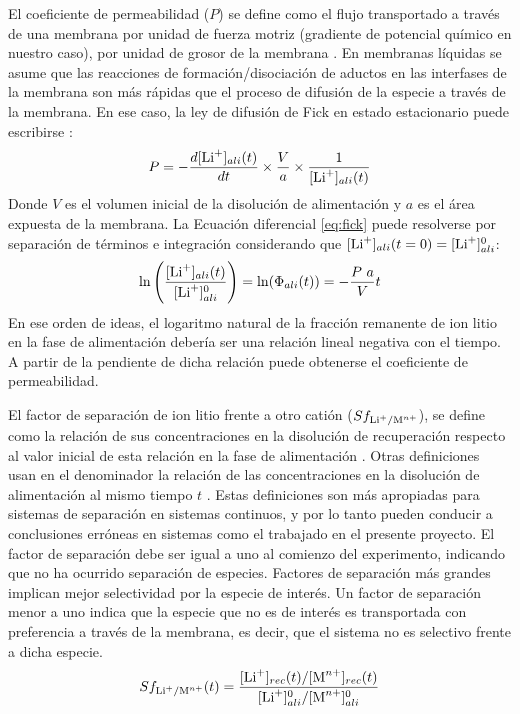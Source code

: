 El coeficiente de permeabilidad ($P$)  se define como el flujo transportado a través de una membrana por unidad de fuerza motriz (gradiente de potencial químico en nuestro caso), por unidad de grosor de la membrana \citep{Koros}. En membranas líquidas se asume que las reacciones de formación/disociación de aductos en las interfases de la membrana son más rápidas que el proceso de difusión de la especie a través de la membrana. En ese caso, la ley de difusión de Fick en estado estacionario puede escribirse \citep{Ma2000}:
\begin{equation}\label{eq:fick}
    P=-\frac{d[\ce{Li^+}]_{ali}(t)}{dt}\times\frac{V}{a}\times\frac{1}{[\ce{Li^+}]_{ali}(t)}
\end{equation}
Donde $V$ es el volumen inicial de la disolución de alimentación y $a$ es el área expuesta de la membrana. La Ecuación diferencial \ref{eq:fick} puede resolverse por separación de términos e integración considerando que $[\ce{Li^+}]_{ali}(t=0)=[\ce{Li^+}]_{ali}^0$:
\begin{equation}
    \ln{\Bigg(\frac{[\ce{Li^+}]_{ali}(t)}{[\ce{Li^+}]_{ali}^0}\Bigg)}=\ln(\Phi_{ali}(t))=-\frac{P~a}{V}t
\end{equation}
En ese orden de ideas, el logaritmo natural de la fracción remanente de ion litio en la fase de alimentación debería ser una relación lineal negativa con el tiempo. A partir de la pendiente de dicha relación puede obtenerse el coeficiente de permeabilidad.

El factor de separación  de ion litio frente a otro catión  ($Sf_{\ce{Li+}/\ce{M^n+}}$), se define como la relación de sus concentraciones en la disolución de recuperación respecto al valor inicial de esta relación en la fase de alimentación \citep{Chen2018}. Otras definiciones usan en el denominador la relación de las concentraciones en la disolución de alimentación al mismo tiempo $t$ \citep{Koros, sharma2016}. Estas definiciones son más apropiadas para sistemas de separación en sistemas continuos, y por lo tanto pueden conducir a conclusiones erróneas en sistemas como el trabajado en el presente proyecto. El factor de separación debe ser igual a uno al comienzo del experimento, indicando que no ha ocurrido separación de especies. Factores de separación más grandes implican mejor selectividad por la especie de interés. Un factor de separación menor a uno indica que la especie que no es de interés es transportada con preferencia a través de la membrana, es decir, que el sistema no es selectivo frente a dicha especie.
\begin{equation}
    Sf_{\ce{Li^+}/\ce{M^n+}}(t)=\frac{[\ce{Li^+}]_{rec}(t)/[\ce{M^n+}]_{rec}(t)}{[\ce{Li^+}]_{ali}^0/[\ce{M^n+}]_{ali}^0}
\end{equation}


